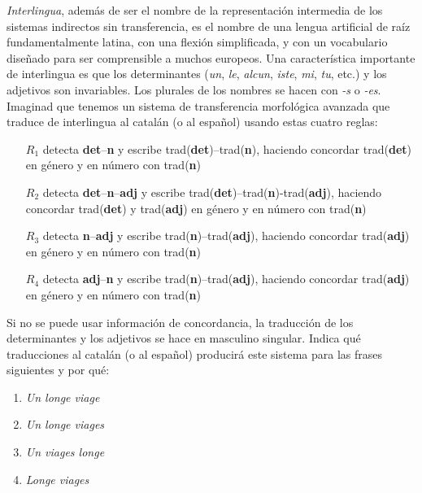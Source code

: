 
\item \emph{Interlingua}, además de ser el nombre de la representación intermedia de los sistemas indirectos sin transferencia, es el nombre de una lengua artificial de raíz fundamentalmente latina, con una flexión simplificada, y con un vocabulario diseñado para ser comprensible a muchos europeos. Una característica importante de interlingua es que los determinantes (\emph{un}, \emph{le}, \emph{alcun}, \emph{iste}, \emph{mi}, \emph{tu}, etc.) y los adjetivos son invariables. Los plurales de los nombres se hacen con  \emph{-s} o \emph{-es}. Imaginad que tenemos un sistema de transferencia morfológica avanzada que traduce de interlingua al catalán (o al español) usando estas cuatro reglas: \begin{itemize} \item[$R_1$] detecta \textbf{det}--\textbf{n} y escribe \textsf{trad}(\textbf{det})--\textsf{trad}(\textbf{n}), haciendo concordar \textsf{trad}(\textbf{det}) en género y en número con \textsf{trad}(\textbf{n}) \item[$R_2$] detecta \textbf{det}--\textbf{n}--\textbf{adj} y escribe \textsf{trad}(\textbf{det})--\textsf{trad}(\textbf{n})-\textsf{trad}(\textbf{adj}), haciendo concordar \textsf{trad}(\textbf{det}) y \textsf{trad}(\textbf{adj}) en género y en número con \textsf{trad}(\textbf{n}) \item[$R_3$] detecta \textbf{n}--\textbf{adj} y escribe \textsf{trad}(\textbf{n})--\textsf{trad}(\textbf{adj}), haciendo concordar \textsf{trad}(\textbf{adj}) en género y en número con \textsf{trad}(\textbf{n}) \item[$R_4$] detecta \textbf{adj}--\textbf{n} y escribe \textsf{trad}(\textbf{n})--\textsf{trad}(\textbf{adj}), haciendo concordar \textsf{trad}(\textbf{adj}) en género y en número con \textsf{trad}(\textbf{n}) \end{itemize} Si no se puede usar información de concordancia, la traducción de los determinantes y los adjetivos se hace en masculino singular. Indica qué traducciones al catalán (o al español) producirá este sistema para las frases siguientes y por qué: \begin{enumerate} \item \emph{Un longe viage} \item \emph{Un longe viages} \item \emph{Un viages longe} \item \emph{Longe viages} 
\end{enumerate}
